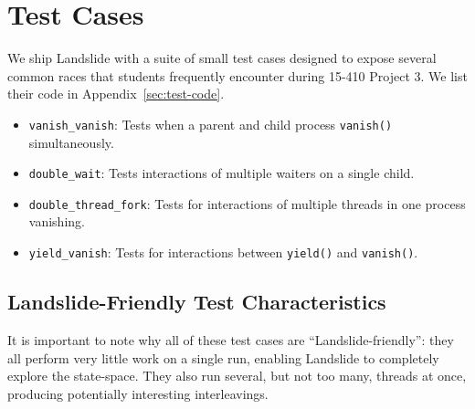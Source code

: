 \section{Test Cases}
\label{sec:using-tests}

We ship Landslide with a suite of small test cases designed to expose several common races that students frequently encounter during 15-410 Project 3. We list their code in Appendix~\ref{sec:test-code}.

\begin{itemize}
        \item \texttt{vanish\_vanish}: Tests when a parent and child process \texttt{vanish()} simultaneously.
        \item \texttt{double\_wait}: Tests interactions of multiple waiters on a single child.
        \item \texttt{double\_thread\_fork}: Tests for interactions of multiple threads in one process vanishing.
        \item \texttt{yield\_vanish}: Tests for interactions between \texttt{yield()} and \texttt{vanish()}.
\end{itemize}

\subsection{Landslide-Friendly Test Characteristics}
\label{sec:using-landslide-friendly-tests}

It is important to note why all of these test cases are ``Landslide-friendly'': they all perform very little work on a single run, enabling Landslide to completely explore the state-space. They also run several, but not too many, threads at once, producing potentially interesting interleavings.
